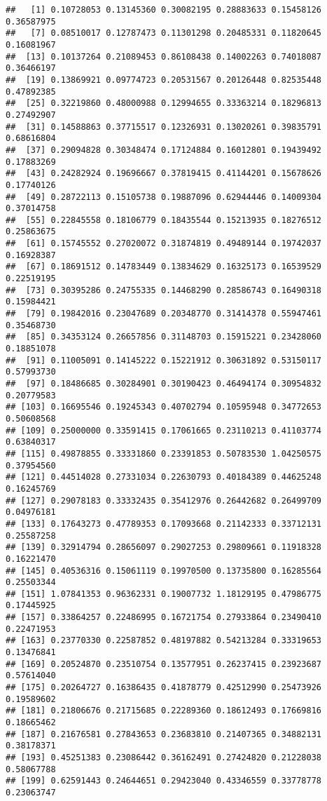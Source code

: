 \documentclass[
]{article}
\begin{document}
\begin{verbatim}
##   [1] 0.10728053 0.13145360 0.30082195 0.28883633 0.15458126 0.36587975
##   [7] 0.08510017 0.12787473 0.11301298 0.20485331 0.11820645 0.16081967
##  [13] 0.10137264 0.21089453 0.86108438 0.14002263 0.74018087 0.36466197
##  [19] 0.13869921 0.09774723 0.20531567 0.20126448 0.82535448 0.47892385
##  [25] 0.32219860 0.48000988 0.12994655 0.33363214 0.18296813 0.27492907
##  [31] 0.14588863 0.37715517 0.12326931 0.13020261 0.39835791 0.68616804
##  [37] 0.29094828 0.30348474 0.17124884 0.16012801 0.19439492 0.17883269
##  [43] 0.24282924 0.19696667 0.37819415 0.41144201 0.15678626 0.17740126
##  [49] 0.28722113 0.15105738 0.19887096 0.62944446 0.14009304 0.37014758
##  [55] 0.22845558 0.18106779 0.18435544 0.15213935 0.18276512 0.25863675
##  [61] 0.15745552 0.27020072 0.31874819 0.49489144 0.19742037 0.16928387
##  [67] 0.18691512 0.14783449 0.13834629 0.16325173 0.16539529 0.22519195
##  [73] 0.30395286 0.24755335 0.14468290 0.28586743 0.16490318 0.15984421
##  [79] 0.19842016 0.23047689 0.20348770 0.31414378 0.55947461 0.35468730
##  [85] 0.34353124 0.26657856 0.31148703 0.15915221 0.23428060 0.18851078
##  [91] 0.11005091 0.14145222 0.15221912 0.30631892 0.53150117 0.57993730
##  [97] 0.18486685 0.30284901 0.30190423 0.46494174 0.30954832 0.20779583
## [103] 0.16695546 0.19245343 0.40702794 0.10595948 0.34772653 0.50608568
## [109] 0.25000000 0.33591415 0.17061665 0.23110213 0.41103774 0.63840317
## [115] 0.49878855 0.33331860 0.23391853 0.50783530 1.04250575 0.37954560
## [121] 0.44514028 0.27331034 0.22630793 0.40184389 0.44625248 0.16245769
## [127] 0.29078183 0.33332435 0.35412976 0.26442682 0.26499709 0.04976181
## [133] 0.17643273 0.47789353 0.17093668 0.21142333 0.33712131 0.25587258
## [139] 0.32914794 0.28656097 0.29027253 0.29809661 0.11918328 0.16221470
## [145] 0.40536316 0.15061119 0.19970500 0.13735800 0.16285564 0.25503344
## [151] 1.07841353 0.96362331 0.19007732 1.18129195 0.47986775 0.17445925
## [157] 0.33864257 0.22486995 0.16721754 0.27933864 0.23490410 0.22471953
## [163] 0.23770330 0.22587852 0.48197882 0.54213284 0.33319653 0.13476841
## [169] 0.20524870 0.23510754 0.13577951 0.26237415 0.23923687 0.57614040
## [175] 0.20264727 0.16386435 0.41878779 0.42512990 0.25473926 0.19589602
## [181] 0.21806676 0.21715685 0.22289360 0.18612493 0.17669816 0.18665462
## [187] 0.21676581 0.27843653 0.23683810 0.21407365 0.34882131 0.38178371
## [193] 0.45251383 0.23086442 0.36162491 0.27424820 0.21228038 0.58067788
## [199] 0.62591443 0.24644651 0.29423040 0.43346559 0.33778778 0.23063747

\end{verbatim}
\end{document}

